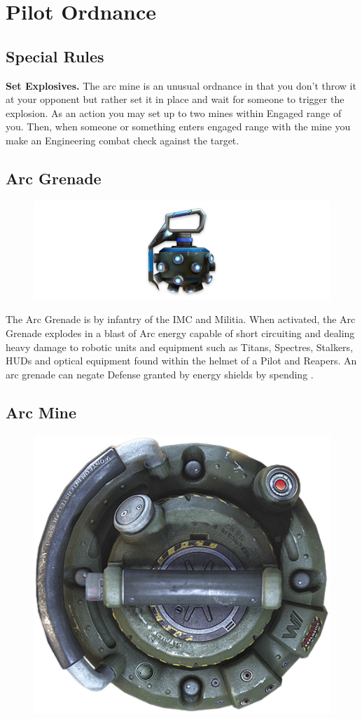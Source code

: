 \documentclass[9pt, openany]{extbook}
\begin{document}
\section{Pilot Ordnance}
\label{sec:pilotordnance}

\subsection{Special Rules}
\textbf{Set Explosives.} The arc mine is an unusual ordnance in that you don't throw it at your opponent but rather set it in place and wait for someone to trigger the explosion. As an action you may set up to two mines within Engaged range of you. Then, when someone or something enters engaged range with the mine you make an Engineering combat check against the target.


\subsection{Arc Grenade}
\begin{figure}
\vspace*{-2em}
\includegraphics[width=\linewidth]{ArcGrenade}
\end{figure}

The Arc Grenade is by infantry of the IMC and Militia. When activated, the Arc Grenade explodes in a blast of Arc energy capable of short circuiting and dealing heavy damage to robotic units and equipment such as Titans, Spectres, Stalkers, HUDs and optical equipment found within the helmet of a Pilot and Reapers. An arc grenade can negate Defense granted by energy shields by spending \Advantage\Advantage.

\subsection{Arc Mine}
\begin{figure}
\vspace*{-2em}\centering
\includegraphics[width=0.5\linewidth]{ArcMine}
\end{figure}
\end{document}
